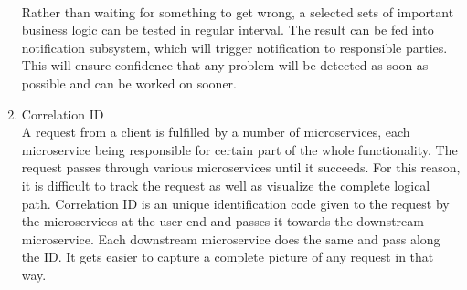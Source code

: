 \begin{enumerate}
\\
Rather than waiting for something to get wrong, a selected sets of important business logic can be tested in regular interval. The result can be fed into notification subsystem, which will trigger notification to responsible parties. This will ensure confidence that any problem will be detected as soon as possible and can be worked on sooner. \cite{Simone:2014aa} \cite{Newman:2015aa}
\item Correlation ID \\
A request from a client is fulfilled by a number of microservices, each microservice being responsible for certain part of the whole functionality. The request passes through various microservices until it succeeds. For this reason, it is difficult to track the request as well as visualize the complete logical path. Correlation ID is an unique identification code given to the request by the microservices at the user end and passes it towards the downstream microservice. Each downstream microservice does the same and pass along the ID. It gets easier to capture a complete picture of any request in that way.
\end{enumerate}

